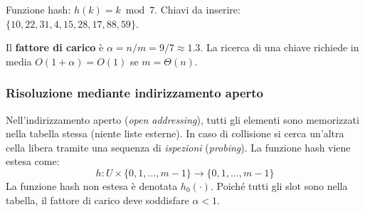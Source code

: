\begin{esempio}[Tabella hash con concatenamento, $m=7$]
	Funzione hash: $h(k) = k \bmod 7$.
	Chiavi da inserire: $\{10, 22, 31, 4, 15, 28, 17, 88, 59\}$.
	
	\begin{center}
	\end{center}
	
	Il \textbf{fattore di carico} è $\alpha = n/m = 9/7 \approx 1.3$.
	La ricerca di una chiave richiede in media $O(1 + \alpha) = O(1)$ se
	$m = \Theta(n)$.
\end{esempio}

\subsubsection{Risoluzione mediante indirizzamento aperto}

\begin{softnote}
	Nell'indirizzamento aperto (\emph{open addressing}), tutti gli elementi sono
	memorizzati nella tabella stessa (niente liste esterne). In caso di
	collisione si cerca un'altra cella libera tramite una sequenza di
	\emph{ispezioni} (\emph{probing}). La funzione hash viene estesa come:
	\[
	h : U \times \{0,1,\ldots,m-1\} \to \{0,1,\ldots,m-1\}
	\]
	La funzione hash non estesa è denotata $h_0(\cdot)$. Poiché tutti gli slot
	sono nella tabella, il fattore di carico deve soddisfare $\alpha < 1$.
\end{softnote}

